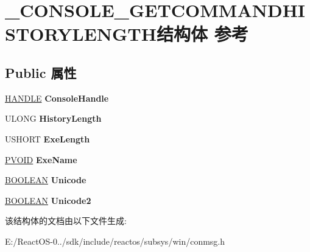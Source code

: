 \hypertarget{struct___c_o_n_s_o_l_e___g_e_t_c_o_m_m_a_n_d_h_i_s_t_o_r_y_l_e_n_g_t_h}{}\section{\+\_\+\+C\+O\+N\+S\+O\+L\+E\+\_\+\+G\+E\+T\+C\+O\+M\+M\+A\+N\+D\+H\+I\+S\+T\+O\+R\+Y\+L\+E\+N\+G\+T\+H结构体 参考}
\label{struct___c_o_n_s_o_l_e___g_e_t_c_o_m_m_a_n_d_h_i_s_t_o_r_y_l_e_n_g_t_h}
\subsection*{Public 属性}
\begin{DoxyCompactItemize}
\item 
\mbox{\label{struct___c_o_n_s_o_l_e___g_e_t_c_o_m_m_a_n_d_h_i_s_t_o_r_y_l_e_n_g_t_h_aac2da6769cbc68959d43de5c50c54e36}} 
\hyperlink{interfacevoid}{H\+A\+N\+D\+LE} {\bfseries Console\+Handle}
\item 
\mbox{\label{struct___c_o_n_s_o_l_e___g_e_t_c_o_m_m_a_n_d_h_i_s_t_o_r_y_l_e_n_g_t_h_afcd87b44467ffbb0d95d63a04c373da3}} 
U\+L\+O\+NG {\bfseries History\+Length}
\item 
\mbox{\label{struct___c_o_n_s_o_l_e___g_e_t_c_o_m_m_a_n_d_h_i_s_t_o_r_y_l_e_n_g_t_h_a7c17d11fe4d5b8d201c8cc027c8ec9fd}} 
U\+S\+H\+O\+RT {\bfseries Exe\+Length}
\item 
\mbox{\label{struct___c_o_n_s_o_l_e___g_e_t_c_o_m_m_a_n_d_h_i_s_t_o_r_y_l_e_n_g_t_h_ac18f32811783f343b88f1e086a11a4eb}} 
\hyperlink{interfacevoid}{P\+V\+O\+ID} {\bfseries Exe\+Name}
\item 
\mbox{\label{struct___c_o_n_s_o_l_e___g_e_t_c_o_m_m_a_n_d_h_i_s_t_o_r_y_l_e_n_g_t_h_ae59c46517489eff904a68cddbb890d8f}} 
\hyperlink{_processor_bind_8h_a112e3146cb38b6ee95e64d85842e380a}{B\+O\+O\+L\+E\+AN} {\bfseries Unicode}
\item 
\mbox{\label{struct___c_o_n_s_o_l_e___g_e_t_c_o_m_m_a_n_d_h_i_s_t_o_r_y_l_e_n_g_t_h_a10e51fe9eb2b0aa2c5d9976a58edda19}} 
\hyperlink{_processor_bind_8h_a112e3146cb38b6ee95e64d85842e380a}{B\+O\+O\+L\+E\+AN} {\bfseries Unicode2}
\end{DoxyCompactItemize}


该结构体的文档由以下文件生成\+:\begin{DoxyCompactItemize}
\item 
E\+:/\+React\+O\+S-\/0../sdk/include/reactos/subsys/win/conmsg.\+h\end{DoxyCompactItemize}
